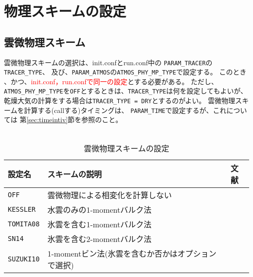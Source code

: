 \section{物理スキームの設定} \label{sec:basic_physics}

\subsection{雲微物理スキーム} \label{sec:basic_microphys}
雲微物理スキームの選択は、init.confとrun.conf中の
\verb|PARAM_TRACER|の\verb|TRACER_TYPE|、
及び、\verb|PARAM_ATMOS|の\verb|ATMOS_PHY_MP_TYPE|で設定する。
このとき{\color{red}{\verb|TRACER_TYPE|と\verb|ATMOS_PHY_MP_TYPE|は普通は同じものを設定し}}
、かつ、\textcolor{red}{init.conf，run.confで同一の設定}とする必要がある。
ただし、\verb|ATMOS_PHY_MP_TYPE|を\verb|OFF|とするときは、\verb|TRACER_TYPE|は何を設定してもよいが、乾燥大気の計算をする場合は\verb|TRACER_TYPE = DRY|とするのがよい。
雲微物理スキームを計算する(callする)タイミングは、
\verb|PARAM_TIME|で設定するが、これについては
第\ref{sec:timeintiv}節を参照のこと。\\



\\

\begin{table}[h]
\begin{center}
  \caption{雲微物理スキームの設定}
  \label{tab:nml_atm_mp}
  \begin{tabularx}{150mm}{lXX} \hline
    \rowcolor[gray]{0.9}  設定名 & スキームの説明 & 文献\\ \hline
     \verb|OFF|      & 雲微物理による相変化を計算しない &  \\
     \verb|KESSLER|  & 水雲のみの1-momentバルク法 & \citet{kessler_1969} \\
     \verb|TOMITA08| & 氷雲を含む1-momentバルク法 & \citet{tomita_2008} \\
     \verb|SN14|     & 氷雲を含む2-momentバルク法 & \citet{sn_2014} \\
     \verb|SUZUKI10| & 1-momentビン法(氷雲を含むか否かはオプションで選択) & \citet{suzuki_etal_2010} \\
    \hline
  \end{tabularx}
\end{center}
\end{table}

